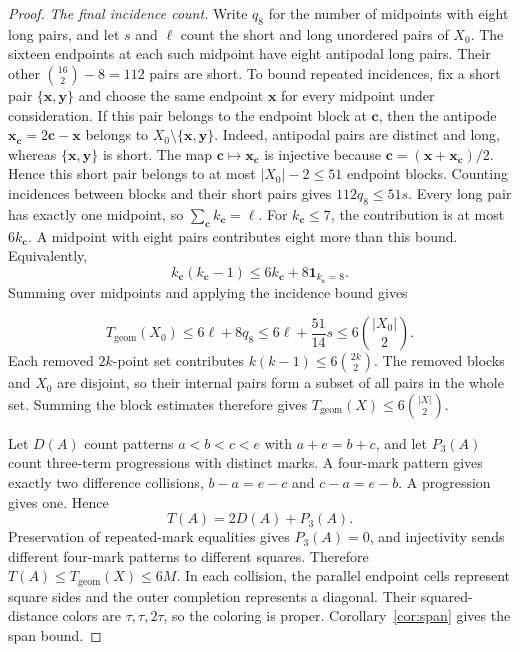 \documentclass[11pt,a4paper]{article}
\newif\ifshowrevisions
\newcommand{\rev}[1]{{\ifshowrevisions\color{red}\fi #1}}
\newenvironment{revision}{\par\begingroup\ifshowrevisions\color{red}\fi}{\par\endgroup}
\theoremstyle{definition}
\newcommand{\ind}{\mathbf1}
\numberwithin{equation}{section}
\begin{document}
\begin{proof}
\begin{revision}
\noindent\emph{The final incidence count.} Write $q_8$ for the number of midpoints with eight long pairs, and let $s$ and $\ell$ count the short and long unordered pairs of $X_0$. The sixteen endpoints at each such midpoint have eight antipodal long pairs. Their other $\binom{16}{2}-8=112$ pairs are short. To bound repeated incidences, fix a short pair $\{\mathbf x,\mathbf y\}$ and choose the same endpoint $\mathbf x$ for every midpoint under consideration. If this pair belongs to the endpoint block at $\mathbf c$, then the antipode $\mathbf x_{\mathbf c}=2\mathbf c-\mathbf x$ belongs to $X_0\setminus\{\mathbf x,\mathbf y\}$. Indeed, antipodal pairs are distinct and long, whereas $\{\mathbf x,\mathbf y\}$ is short. The map $\mathbf c\mapsto\mathbf x_{\mathbf c}$ is injective because $\mathbf c=(\mathbf x+\mathbf x_{\mathbf c})/2$. Hence this short pair belongs to at most $|X_0|-2\le51$ endpoint blocks. Counting incidences between blocks and their short pairs gives $112q_8\le51s$.
Every long pair has exactly one midpoint, so $\sum_{\mathbf c}k_{\mathbf c}=\ell$.
For $k_{\mathbf c}\le7$, the contribution is at most $6k_{\mathbf c}$. A midpoint
with eight pairs contributes eight more than this bound. Equivalently,
\[
k_{\mathbf c}(k_{\mathbf c}-1)
\le6k_{\mathbf c}+8\ind_{k_{\mathbf c}=8}.
\]
Summing over midpoints and applying the incidence bound gives
\end{revision}
\begin{equation}\label{eq:two-distance-eight}
T_{\mathrm{geom}}(X_0)\le6\ell+8q_8
\le6\ell+\frac{51}{14}s\le6\binom{|X_0|}{2}.
\end{equation}
Each removed $2k$-point set contributes $k(k-1)\le6\binom{2k}{2}$. The removed blocks and $X_0$ are disjoint, so their internal pairs form a subset of all pairs in the whole set. Summing the block estimates therefore gives $T_{\mathrm{geom}}(X)\le6\binom{|X|}{2}$.

\medskip\noindent\rev{\emph{Return to the integer source.}}
Let $D(A)$ count patterns $a<b<c<e$ with $a+e=b+c$, and let $P_3(A)$ count three-term progressions with distinct marks. A four-mark pattern gives exactly two difference collisions, $b-a=e-c$ and $c-a=e-b$. A progression gives one. Hence
\begin{equation}\label{eq:four-mark-corners}
T(A)=2D(A)+P_3(A).
\end{equation}
Preservation of repeated-mark equalities gives $P_3(A)=0$, and injectivity sends different four-mark patterns to different squares. Therefore $T(A)\le T_{\mathrm{geom}}(X)\le6M$. In each collision, the parallel endpoint cells represent square sides and the outer completion represents a diagonal. Their squared-distance colors are $\tau,\tau,2\tau$, so the coloring is proper. Corollary~\ref{cor:span} gives the span bound.
\end{proof}
\end{document}
